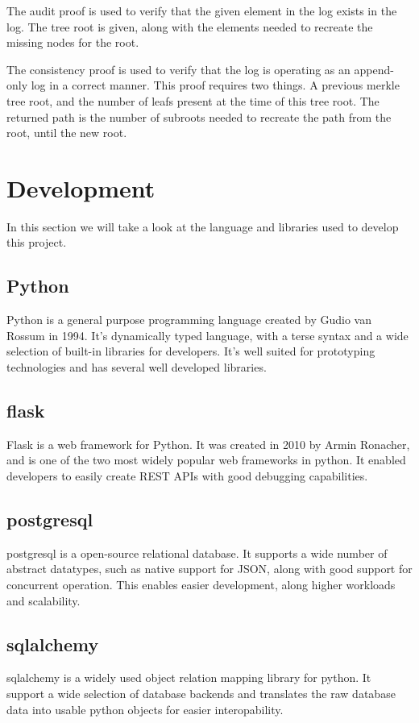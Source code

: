 \documentclass[../Main/thesis.tex]{subfiles}
\begin{document}
The audit proof is used to  verify that the given element in the log exists
in the log. The tree root is given, along with the elements needed to
recreate the missing nodes for the root.

The consistency proof is used to verify that the log is operating as an
append-only log in a correct manner. This proof requires two things. A
previous merkle tree root, and the number of leafs present at the time of
this tree root. The returned path is the number of subroots needed to
recreate the path from the root, until the new root.

\section{Development}\label{sec:development} 
In this section we will take a look at the language and libraries used to
develop this project.

\subsection*{Python}
Python is a general purpose programming language created by Gudio van Rossum in
1994. It's dynamically typed language, with a terse syntax and a wide selection
of built-in libraries for developers. It's well suited for prototyping
technologies and has several well developed libraries.

\subsection*{flask}
Flask is a web framework for Python. It was created in 2010 by Armin Ronacher,
and is one of the two most widely popular web frameworks in python. It enabled
developers to easily create REST APIs with good debugging capabilities.

\subsection*{postgresql}
postgresql is a open-source relational database. It supports a wide number of
abstract datatypes, such as native support for JSON, along with good support for
concurrent operation. This enables easier development, along higher workloads
and scalability.

\subsection*{sqlalchemy}
sqlalchemy is a widely used object relation mapping library for python. It
support a wide selection of database backends and translates the raw database
data into usable python objects for easier interopability.
\end{document}
